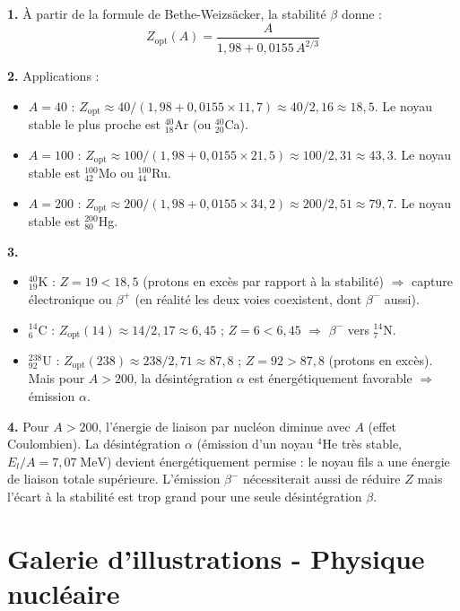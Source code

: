 \documentclass[12pt,a4paper]{article}
\begin{document}
\begin{boitecorrige}
\textbf{1.} À partir de la formule de Bethe-Weizsäcker, la stabilité $\beta$ donne :
\[
Z_\text{opt}(A) = \frac{A}{1{,}98 + 0{,}0155\,A^{2/3}}
\]

\textbf{2.} Applications :
\begin{itemize}[nosep]
  \item $A = 40$ : $Z_\text{opt} \approx 40/(1{,}98 + 0{,}0155\times 11{,}7) \approx 40/2{,}16 \approx 18{,}5$. Le noyau stable le plus proche est ${}^{40}_{18}$Ar (ou ${}^{40}_{20}$Ca).
  \item $A = 100$ : $Z_\text{opt} \approx 100/(1{,}98 + 0{,}0155\times 21{,}5) \approx 100/2{,}31 \approx 43{,}3$. Le noyau stable est ${}^{100}_{42}$Mo ou ${}^{100}_{44}$Ru.
  \item $A = 200$ : $Z_\text{opt} \approx 200/(1{,}98 + 0{,}0155\times 34{,}2) \approx 200/2{,}51 \approx 79{,}7$. Le noyau stable est ${}^{200}_{80}$Hg.
\end{itemize}

\textbf{3.}
\begin{itemize}[nosep]
  \item ${}^{40}_{19}$K : $Z = 19 < 18{,}5$ (protons en excès par rapport à la stabilité) $\Rightarrow$ capture électronique ou $\beta^+$ (en réalité les deux voies coexistent, dont $\beta^-$ aussi).
  \item ${}^{14}_{6}$C : $Z_\text{opt}(14) \approx 14/2{,}17 \approx 6{,}45$ ; $Z = 6 < 6{,}45$ $\Rightarrow$ \textbf{$\beta^-$} vers ${}^{14}_{7}$N.
  \item ${}^{238}_{92}$U : $Z_\text{opt}(238) \approx 238/2{,}71 \approx 87{,}8$ ; $Z = 92 > 87{,}8$ (protons en excès). Mais pour $A > 200$, la désintégration $\alpha$ est énergétiquement favorable $\Rightarrow$ émission $\alpha$.
\end{itemize}

\textbf{4.} Pour $A > 200$, l'énergie de liaison par nucléon diminue avec $A$ (effet Coulombien). La désintégration $\alpha$ (émission d'un noyau ${}^4$He très stable, $E_l/A = 7{,}07\;\text{MeV}$) devient énergétiquement permise : le noyau fils a une énergie de liaison totale supérieure. L'émission $\beta^-$ nécessiterait aussi de réduire $Z$ mais l'écart à la stabilité est trop grand pour une seule désintégration $\beta$.
\end{boitecorrige}

\newpage
\section*{Galerie d'illustrations - Physique nucléaire}
\end{document}
